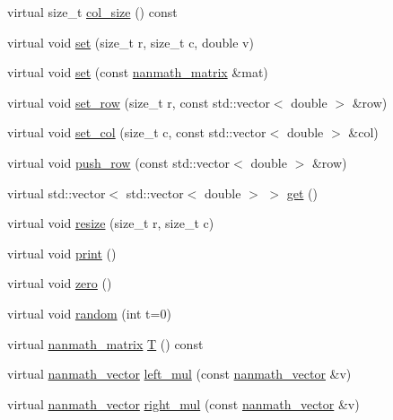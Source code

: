 \begin{DoxyCompactItemize}
\item 
virtual size\+\_\+t \hyperlink{classnanmath_1_1nanmath__matrix_a4fcc48d81fc393f7cbee5e3c1fe04f75}{col\+\_\+size} () const 
\item 
virtual void \hyperlink{classnanmath_1_1nanmath__matrix_a96c4e5fed99527adee5ff5b756589d0d}{set} (size\+\_\+t r, size\+\_\+t c, double v)
\item 
virtual void \hyperlink{classnanmath_1_1nanmath__matrix_a0074200e9eaa3ffb2b9ce6602e1bfd5d}{set} (const \hyperlink{classnanmath_1_1nanmath__matrix}{nanmath\+\_\+matrix} \&mat)
\item 
virtual void \hyperlink{classnanmath_1_1nanmath__matrix_afd46732914cf6da29d584cbbb4a47499}{set\+\_\+row} (size\+\_\+t r, const std\+::vector$<$ double $>$ \&row)
\item 
virtual void \hyperlink{classnanmath_1_1nanmath__matrix_af5eea2f6b98686e9b243c02513908d16}{set\+\_\+col} (size\+\_\+t c, const std\+::vector$<$ double $>$ \&col)
\item 
virtual void \hyperlink{classnanmath_1_1nanmath__matrix_a2611cc9aef30706e7f11e15cd2405699}{push\+\_\+row} (const std\+::vector$<$ double $>$ \&row)
\item 
virtual std\+::vector$<$ std\+::vector$<$ double $>$ $>$ \hyperlink{classnanmath_1_1nanmath__matrix_aac2fd129eff7ea0248ccc49e24414454}{get} ()
\item 
virtual void \hyperlink{classnanmath_1_1nanmath__matrix_ac27e457cd31058c95b9b5ccf7b4809c0}{resize} (size\+\_\+t r, size\+\_\+t c)
\item 
virtual void \hyperlink{classnanmath_1_1nanmath__matrix_a114b8a9aa414e94b06c0ddd9496a34d8}{print} ()
\item 
virtual void \hyperlink{classnanmath_1_1nanmath__matrix_aa4dadc0c46659f398ad576eac8c3b064}{zero} ()
\item 
virtual void \hyperlink{classnanmath_1_1nanmath__matrix_a625284547b9fbbef11b331cf312cd74e}{random} (int t=0)
\item 
virtual \hyperlink{classnanmath_1_1nanmath__matrix}{nanmath\+\_\+matrix} \hyperlink{classnanmath_1_1nanmath__matrix_a1e04289b0bfb7556f2d4c25d49a8198d}{T} () const 
\item 
virtual \hyperlink{classnanmath_1_1nanmath__vector}{nanmath\+\_\+vector} \hyperlink{classnanmath_1_1nanmath__matrix_aaebae090e22fdb90b531ea376a958959}{left\+\_\+mul} (const \hyperlink{classnanmath_1_1nanmath__vector}{nanmath\+\_\+vector} \&v)
\item 
virtual \hyperlink{classnanmath_1_1nanmath__vector}{nanmath\+\_\+vector} \hyperlink{classnanmath_1_1nanmath__matrix_a785f78f5f75769e2e4d1dbe23c37ea2a}{right\+\_\+mul} (const \hyperlink{classnanmath_1_1nanmath__vector}{nanmath\+\_\+vector} \&v)

\end{DoxyCompactItemize}
